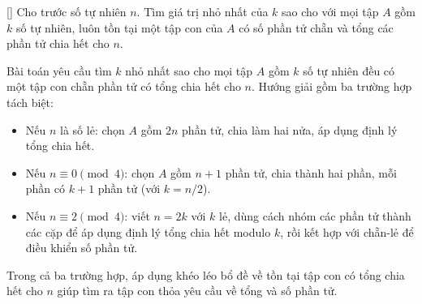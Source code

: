 \documentclass[../09-contruction-methods.tex]{subfiles}
\begin{document}
\begin{example*}\label{example:IRN-2015-TST-D2-P1}[\textbf{}]
	Cho trước số tự nhiên \( n \). Tìm giá trị nhỏ nhất của \( k \) sao cho với mọi tập \( A \) gồm \( k \) số tự nhiên,
	luôn tồn tại một tập con của \( A \) có số phần tử chẵn và tổng các phần tử chia hết cho \( n \).
\end{example*}

\begin{story*}
	Bài toán yêu cầu tìm \( k \) nhỏ nhất sao cho mọi tập \( A \) gồm \( k \) số tự nhiên đều có một tập con chẵn phần tử có tổng chia hết cho \( n \).  
	Hướng giải gồm ba trường hợp tách biệt:
	\begin{itemize}[topsep=0pt, partopsep=0pt, itemsep=0pt]
		\item Nếu \( n \) là số lẻ: chọn \( A \) gồm \( 2n \) phần tử, chia làm hai nửa, áp dụng định lý tổng chia hết.
		\item Nếu \( n \equiv 0 \pmod{4} \): chọn \( A \) gồm \( n + 1 \) phần tử, chia thành hai phần, mỗi phần có \( k + 1 \) phần tử (với \( k = n/2 \)).
		\item Nếu \( n \equiv 2 \pmod{4} \): viết \( n = 2k \) với \( k \) lẻ, dùng cách nhóm các phần tử thành các cặp để áp dụng định lý tổng chia hết modulo \( k \), rồi kết hợp với chẵn-lẻ để điều khiển số phần tử.
	\end{itemize}
	Trong cả ba trường hợp, áp dụng khéo léo bổ đề về tồn tại tập con có tổng chia hết cho \( n \) giúp tìm ra tập con thỏa yêu cầu về tổng và số phần tử.
\end{story*}
\end{document}
